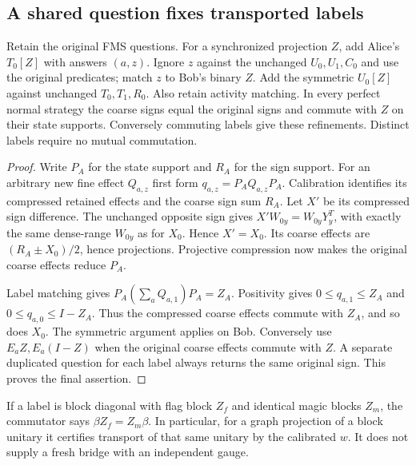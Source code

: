 \subsection{A shared question fixes transported labels}
\begin{lemma}\label{lem:label}
Retain the original FMS questions. For a synchronized projection $Z$, add Alice's $T_0[Z]$ with answers $(a,z)$. Ignore $z$ against the unchanged $U_0,U_1,C_0$ and use the original predicates; match $z$ to Bob's binary $Z$. Add the symmetric $U_0[Z]$ against unchanged $T_0,T_1,R_0$. Also retain activity matching. In every perfect normal strategy the coarse signs equal the original signs and commute with $Z$ on their state supports. Conversely commuting labels give these refinements. Distinct labels require no mutual commutation.
\end{lemma}
\begin{proof}
Write $P_A$ for the state support and $R_A$ for the sign support. For an arbitrary new fine effect $Q_{a,z}$ first form $q_{a,z}=P_AQ_{a,z}P_A$. Calibration identifies its compressed retained effects and the coarse sign sum $R_A$. Let $X'$ be its compressed sign difference. The unchanged opposite sign gives $X'W_{0y}=W_{0y}Y_y^T$, with exactly the same dense-range $W_{0y}$ as for $X_0$. Hence $X'=X_0$. Its coarse effects are $(R_A\pm X_0)/2$, hence projections. Projective compression now makes the original coarse effects reduce $P_A$.

Label matching gives $P_A(\sum_aQ_{a,1})P_A=Z_A$. Positivity gives $0\leq q_{a,1}\leq Z_A$ and $0\leq q_{a,0}\leq I-Z_A$. Thus the compressed coarse effects commute with $Z_A$, and so does $X_0$. The symmetric argument applies on Bob. Conversely use $E_aZ,E_a(I-Z)$ when the original coarse effects commute with $Z$. A separate duplicated question for each label always returns the same original sign. This proves the final assertion.
\end{proof}

If a label is block diagonal with flag block $Z_f$ and identical magic blocks $Z_m$, the commutator says $\beta Z_f=Z_m\beta$. In particular, for a graph projection of a block unitary it certifies transport of that same unitary by the calibrated $w$. It does not supply a fresh bridge with an independent gauge.
